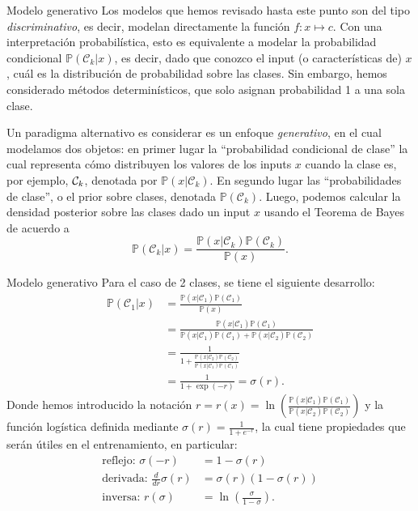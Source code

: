 \documentclass[handout, 9pt]{beamer}
\begin{document}
\begin{frame}{Modelo generativo}
Los modelos que hemos revisado hasta este punto son del tipo \emph{discriminativo}, es decir, modelan directamente la función $f:x\mapsto c$. Con una interpretación probabilística, esto es equivalente a modelar la probabilidad condicional $\mathbb{P}(\mathcal{C}_k|x)$, es decir, dado que conozco el input (o características de) $x$, cuál es la distribución de probabilidad sobre las clases. Sin embargo, hemos considerado métodos determinísticos, que solo asignan probabilidad 1 a una sola clase. \pause
\vspace{0.5cm}

Un paradigma alternativo es considerar es un enfoque \emph{generativo}, en el cual modelamos dos  objetos: en primer lugar la ``probabilidad condicional de clase'' la cual representa cómo distribuyen los valores de los inputs $x$ cuando la  clase es, por  ejemplo, ${\mathcal C}_k$, denotada por $\mathbb{P}(x|\mathcal{C}_k)$. En segundo lugar las ``probabilidades de clase'', o el prior sobre clases, denotada $\mathbb{P}(\mathcal{C}_k)$. Luego, podemos calcular la densidad posterior sobre las clases dado un input $x$ usando el Teorema de Bayes de acuerdo a 
\begin{equation*}
  \mathbb{P}(\mathcal{C}_k|x) = \frac{\mathbb{P}(x|\mathcal{C}_k)\mathbb{P}(\mathcal{C}_k)}{\mathbb{P}(x)}.
\end{equation*}

\end{frame}

\begin{frame}{Modelo generativo}
Para el caso de 2 clases, se tiene el siguiente desarrollo: \pause 
\begin{align*}
  \mathbb{P}(\mathcal{C}_1|x) 
  &= \frac{\mathbb{P}(x|\mathcal{C}_1)\mathbb{P}(\mathcal{C}_1)}{\mathbb{P}(x)}\nonumber\\
  &= \frac{\mathbb{P}(x|\mathcal{C}_1)\mathbb{P}(\mathcal{C}_1)}{\mathbb{P}(x|\mathcal{C}_1)\mathbb{P}(\mathcal{C}_1)+\mathbb{P}(x|\mathcal{C}_2)\mathbb{P}(\mathcal{C}_2)}\nonumber\\
  &=\frac{1}{1+\frac{\mathbb{P}(x|\mathcal{C}_2)\mathbb{P}(\mathcal{C}_2)}{\mathbb{P}(x|\mathcal{C}_1)\mathbb{P}(\mathcal{C}_1)}}\nonumber\\
  &=\frac{1}{1+\exp(-r)} = \sigma(r).\label{eq:logistic1}
\end{align*} \pause 
Donde hemos introducido la notación $r = r(x) =\ln\left(\frac{\mathbb{P}(x|\mathcal{C}_1)\mathbb{P}(\mathcal{C}_1)}{\mathbb{P}(x|\mathcal{C}_2)\mathbb{P}(\mathcal{C}_2)}\right)$  y la  función logística definida mediante $\sigma(r) = \frac{1}{1+e^{-r}}$, la cual  tiene propiedades que serán útiles en el entrenamiento, en particular: \pause
\begin{align*}
  \text{reflejo: }\sigma(-r)&=1-\sigma(r)\\
  \text{derivada: }\frac{d}{dr}\sigma(r)&=\sigma(r)(1-\sigma(r))\\
  \text{inversa: }r(\sigma)&=\ln\left(\frac{\sigma}{1-\sigma}\right).
\end{align*}


\end{frame}
\end{document}
